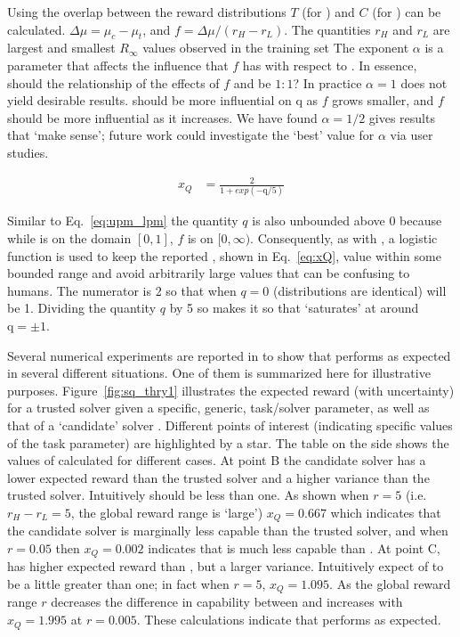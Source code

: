Using \hell{} the overlap between the \pri{} reward distributions $T$ (for \solvestar) and $C$ (for \solve) can be calculated. $\Delta \mu = \mu_c-\mu_t$, and $f = \Delta \mu/(r_H-r_L)$. The quantities $r_H$ and $r_L$ are largest and smallest $R_{\infty}$ values observed in the \solvestar{} training set The exponent $\alpha$ is a parameter that affects the influence that $f$ has with respect to \hell. In essence, should the relationship of the effects of $f$ and \hell{} be $1:1$? In practice $\alpha=1$ does not yield desirable results. \hell{} should be more influential on $\text{q}$ as $f$ grows smaller, and $f$ should be more influential as it increases. We have found $\alpha=1/2$ gives results that `make sense'; future work could investigate the `best' value for $\alpha$ via user studies.

    \begin{align}
        x_{Q} &= \frac{2}{1+exp(-\text{q}/5)}\label{eq:xQ}
    \end{align}

Similar to Eq.~\ref{eq:upm_lpm} the quantity $q$ is also unbounded above $0$ because while \hell{} is on the domain $[0,1]$, $f$ is on $[0,\infty)$. Consequently, as with \xO{}, a logistic function is used to keep the reported \xQ{}, shown in Eq.~\ref{eq:xQ}, value within some bounded range and avoid arbitrarily large values that can be confusing to humans. The numerator is 2 so that when $q=0$ (distributions are identical) \xQ{} will be 1. Dividing the quantity $q$ by 5 so makes it so that \xQ{} `saturates' at around $\text{q}=\pm1$.

Several numerical experiments are reported in \cite{Israelsen2018-qz} to show that \xQ{} performs as expected in several different situations. One of them is summarized here for illustrative purposes. Figure~\ref{fig:sq_thry1} illustrates the expected reward (with uncertainty) for a trusted solver \solvestar{} given a specific, generic, task/solver parameter, as well as that of a `candidate' solver \solve. Different points of interest (indicating specific values of the task parameter) are highlighted by a star. The table on the side shows the values of \xQ{} calculated for different cases. At point B the candidate solver has a lower expected reward than the trusted solver and a higher variance than the trusted solver. Intuitively \xQ{} should be less than one. As shown when $r=5$ (i.e. $r_H-r_L=5$, the global reward range is `large') $x_Q=0.667$ which indicates that the candidate solver is marginally less capable than the trusted solver, and when $r=0.05$ then $x_Q=0.002$ indicates that \solve{} is much less capable than \solvestar. At point C, \solve{} has higher expected reward than \solvestar, but a larger variance. Intuitively expect \xQ{} of \solve{} to be a little greater than one; in fact when $r=5$, $x_Q=1.095$. As the global reward range $r$ decreases the difference in capability between \solve{} and \solvestar{} increases with $x_Q=1.995$ at $r=0.005$. These calculations indicate that \xQ{} performs as expected.

